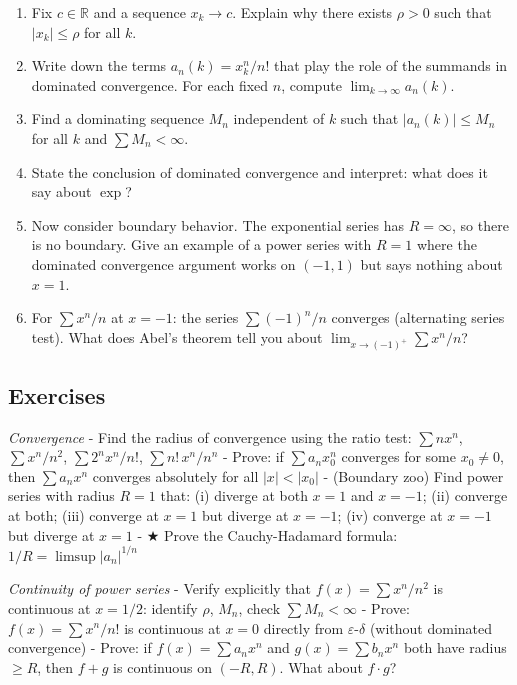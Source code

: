 \documentclass[
  10pt,
  letterpaper,
]{scrbook}
\newcommand{\RR}{\mathbb{R}}
\begin{document}
\begin{enumerate}
\def\labelenumi{(\alph{enumi})}
\item
  Fix \(c \in \RR\) and a sequence \(x_k \to c\). Explain why there
  exists \(\rho > 0\) such that \(|x_k| \leq \rho\) for all \(k\).
\item
  Write down the terms \(a_n(k) = x_k^n / n!\) that play the role of the
  summands in dominated convergence. For each fixed \(n\), compute
  \(\lim_{k \to \infty} a_n(k)\).
\item
  Find a dominating sequence \(M_n\) independent of \(k\) such that
  \(|a_n(k)| \leq M_n\) for all \(k\) and \(\sum M_n < \infty\).
\item
  State the conclusion of dominated convergence and interpret: what does
  it say about \(\exp\)?
\item
  Now consider boundary behavior. The exponential series has
  \(R = \infty\), so there is no boundary. Give an example of a power
  series with \(R = 1\) where the dominated convergence argument works
  on \((-1, 1)\) but says nothing about \(x = 1\).
\item
  For \(\sum x^n / n\) at \(x = -1\): the series \(\sum (-1)^n / n\)
  converges (alternating series test). What does Abel's theorem tell you
  about \(\lim_{x \to (-1)^+} \sum x^n / n\)?
\end{enumerate}

\subsection{Exercises}\label{exercises-26}

\emph{Convergence} - Find the radius of convergence using the ratio
test: \(\sum n x^n\), \(\sum x^n / n^2\), \(\sum 2^n x^n / n!\),
\(\sum n! \, x^n / n^n\) - Prove: if \(\sum a_n x_0^n\) converges for
some \(x_0 \neq 0\), then \(\sum a_n x^n\) converges absolutely for all
\(|x| < |x_0|\) - (Boundary zoo) Find power series with radius \(R = 1\)
that: (i) diverge at both \(x = 1\) and \(x = -1\); (ii) converge at
both; (iii) converge at \(x = 1\) but diverge at \(x = -1\); (iv)
converge at \(x = -1\) but diverge at \(x = 1\) - ★ Prove the
Cauchy-Hadamard formula: \(1/R = \limsup |a_n|^{1/n}\)

\emph{Continuity of power series} - Verify explicitly that
\(f(x) = \sum x^n / n^2\) is continuous at \(x = 1/2\): identify
\(\rho\), \(M_n\), check \(\sum M_n < \infty\) - Prove:
\(f(x) = \sum x^n / n!\) is continuous at \(x = 0\) directly from
\(\varepsilon\)-\(\delta\) (without dominated convergence) - Prove: if
\(f(x) = \sum a_n x^n\) and \(g(x) = \sum b_n x^n\) both have radius
\(\geq R\), then \(f + g\) is continuous on \((-R, R)\). What about
\(f \cdot g\)?
\end{document}
